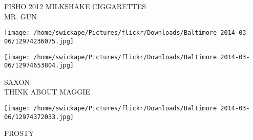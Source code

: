 \documentclass[10pt,letterpaper]{article}
\begin{document}
FISHO 2012 MILKSHAKE CIGGARETTES\\
MR. GUN\\
\pagebreak

\texttt{[image: /home/swickape/Pictures/flickr/Downloads/Baltimore 2014-03-06/12974236075.jpg]}

\vspace{0.25in}
\texttt{[image: /home/swickape/Pictures/flickr/Downloads/Baltimore 2014-03-06/12974653804.jpg]}

SAXON\\
THINK ABOUT MAGGIE\\
\pagebreak

\texttt{[image: /home/swickape/Pictures/flickr/Downloads/Baltimore 2014-03-06/12974372033.jpg]}

FROSTY\\
\pagebreak
\end{document}
